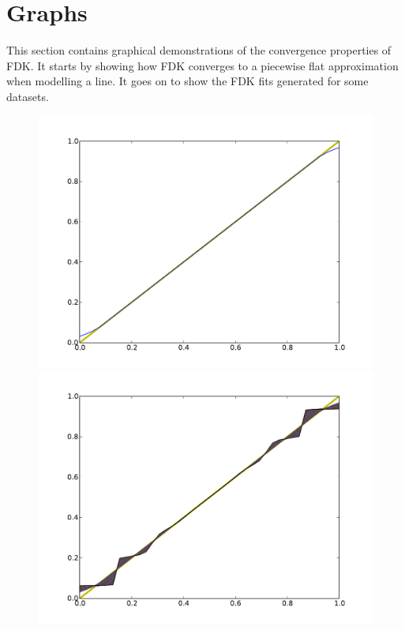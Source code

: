 \section{Graphs}
This section contains graphical demonstrations of the convergence
properties of FDK. It starts by showing how FDK converges to
a piecewise flat approximation when modelling a line.
It goes on to show the FDK fits generated for some datasets.

\begin{figure}[!htb]
    \includegraphics[width=\linewidth]{../writeup/figs/linefit.pdf}
  \endminipage\hfill
    \includegraphics[width=\linewidth]{../writeup/figs/linefitmid.pdf}

\end{figure}

